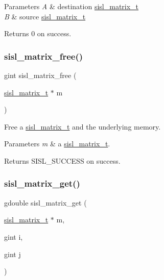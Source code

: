 \begin{DoxyParams}{Parameters}
{\em A} & destination \mbox{\hyperlink{group__matrix_gad147923587b355644defb9bfbf981740}{sisl\+\_\+matrix\+\_\+t}} \\
\hline
{\em B} & source \mbox{\hyperlink{group__matrix_gad147923587b355644defb9bfbf981740}{sisl\+\_\+matrix\+\_\+t}}\\
\hline
\end{DoxyParams}
\begin{DoxyReturn}{Returns}
0 on success. 
\end{DoxyReturn}
\mbox{\label{group__matrix_ga35de2cf4acfbe6e820f895a2ace8b328}} 
\subsubsection{\texorpdfstring{sisl\+\_\+matrix\+\_\+free()}{sisl\_matrix\_free()}}
{\footnotesize\ttfamily gint sisl\+\_\+matrix\+\_\+free (\begin{DoxyParamCaption}\item[{\mbox{\hyperlink{group__matrix_gad147923587b355644defb9bfbf981740}{sisl\+\_\+matrix\+\_\+t}} $\ast$}]{m }\end{DoxyParamCaption})}

Free a \mbox{\hyperlink{group__matrix_gad147923587b355644defb9bfbf981740}{sisl\+\_\+matrix\+\_\+t}} and the underlying memory.


\begin{DoxyParams}{Parameters}
{\em m} & a \mbox{\hyperlink{group__matrix_gad147923587b355644defb9bfbf981740}{sisl\+\_\+matrix\+\_\+t}}.\\
\hline
\end{DoxyParams}
\begin{DoxyReturn}{Returns}
S\+I\+S\+L\+\_\+\+S\+U\+C\+C\+E\+SS on success. 
\end{DoxyReturn}
\mbox{\label{group__matrix_ga441d1109b3297e94b7c4fba2b618ea0c}} 
\subsubsection{\texorpdfstring{sisl\+\_\+matrix\+\_\+get()}{sisl\_matrix\_get()}}
{\footnotesize\ttfamily gdouble sisl\+\_\+matrix\+\_\+get (\begin{DoxyParamCaption}\item[{\mbox{\hyperlink{group__matrix_gad147923587b355644defb9bfbf981740}{sisl\+\_\+matrix\+\_\+t}} $\ast$}]{m,  }\item[{gint}]{i,  }\item[{gint}]{j }\end{DoxyParamCaption})}

